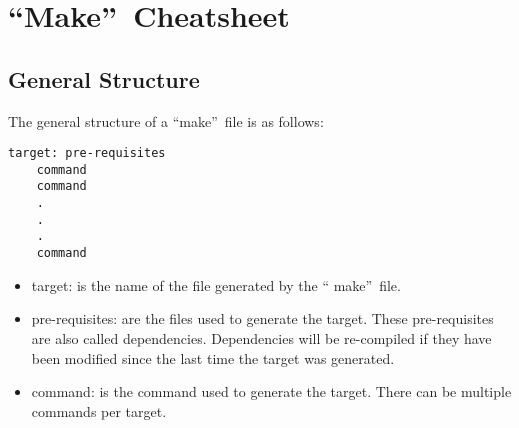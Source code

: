 \section{\textquotedblleft Make\textquotedblright\ Cheatsheet}

\subsection{General Structure}

The general structure of a \textquotedblleft make\textquotedblright\ file is as
follows:
\begin{verbatim}
target: pre-requisites
    command
    command
    .
    .
    .
    command
\end{verbatim}
\begin{itemize}
    \item target: is the name of the file generated by the \textquotedblleft
    make\textquotedblright\ file.
    \item pre-requisites: are the files used to generate the target. These 
    pre-requisites are also called dependencies. Dependencies will be 
    re-compiled if they have been modified since the last time the target was
    generated.
    \item command: is the command used to generate the target. There can be
    multiple commands per target.
\end{itemize}

